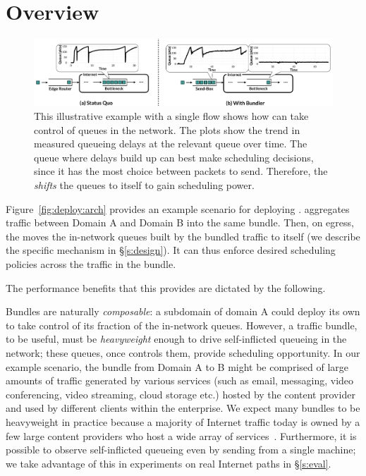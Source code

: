 \section{Overview}\label{s:deploy}
\begin{figure}[t]
    \centering
    \includegraphics[width=\textwidth]{img/shift-bottleneck-combined}
    \caption{This illustrative example with a single flow shows how \name can take control of queues in the network. The plots show the trend in measured queueing delays at the relevant queue over time. The queue where delays build up can best make scheduling decisions, since it has the most choice between packets to send. Therefore, the \inbox \emph{shifts} the queues to itself to gain scheduling power. }\label{fig:design:shift-bottleneck}
\end{figure}
%


Figure~\ref{fig:deploy:arch} provides an example scenario for deploying \name. 
\name aggregates traffic between Domain A and Domain B into the same bundle. 
Then, on egress, the \inbox moves the in-network queues built by the bundled traffic to itself (we describe the specific mechanism in \S\ref{s:design}). 
It can thus enforce desired scheduling policies across the traffic in the bundle.

The performance benefits that this provides are dictated by the following.

Bundles are naturally \emph{composable}: a subdomain of domain A could deploy its own \name to take control of its fraction of the in-network queues. 
However, a traffic bundle, to be useful, must be \emph{heavyweight} enough to drive self-inflicted queueing in the network; these queues, once \name controls them, provide scheduling opportunity.
In our example scenario, the bundle from Domain A to B might be comprised of large amounts of traffic generated by various services (such as email, messaging, video conferencing, video streaming, cloud storage etc.) hosted by the content provider and used by different clients within the enterprise.
We expect many bundles to be heavyweight in practice because a majority of Internet traffic today is owned by a few large content providers who host a wide array of services~\cite{fivecomps, labovitz}. 
Furthermore, it is possible to observe self-inflicted queueing even by sending from a single machine; we take advantage of this in experiments on real Internet paths in \S\ref{s:eval}. 

